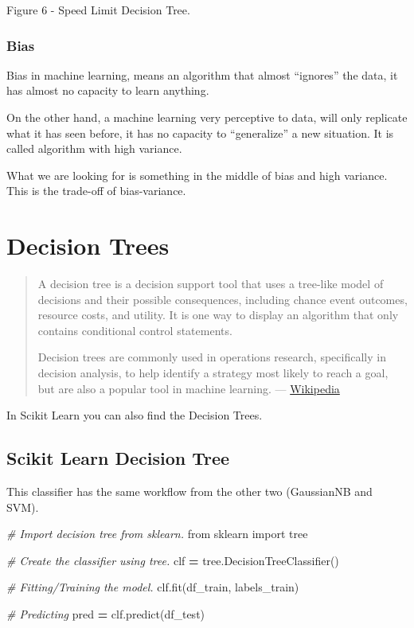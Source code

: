 \documentclass[]{book}
\newenvironment{Shaded}{\begin{snugshade}}{\end{snugshade}}
\newcommand{\ImportTok}[1]{#1}
\newcommand{\CommentTok}[1]{\textcolor[rgb]{0.56,0.35,0.01}{\textit{#1}}}
\newcommand{\OperatorTok}[1]{\textcolor[rgb]{0.81,0.36,0.00}{\textbf{#1}}}
\newcommand{\NormalTok}[1]{#1}
\begin{document}
Figure 6 - Speed Limit Decision Tree.

\subsubsection{Bias}\label{bias}

Bias in machine learning, means an algorithm that almost ``ignores'' the
data, it has almost no capacity to learn anything.

On the other hand, a machine learning very perceptive to data, will only
replicate what it has seen before, it has no capacity to ``generalize''
a new situation. It is called algorithm with high variance.

What we are looking for is something in the middle of bias and high
variance. This is the trade-off of bias-variance.

\section{Decision Trees}\label{decision-trees-1}

\begin{quote}
A decision tree is a decision support tool that uses a tree-like model
of decisions and their possible consequences, including chance event
outcomes, resource costs, and utility. It is one way to display an
algorithm that only contains conditional control statements.

Decision trees are commonly used in operations research, specifically in
decision analysis, to help identify a strategy most likely to reach a
goal, but are also a popular tool in machine learning. ---
\href{https://en.wikipedia.org/wiki/Decision_tree}{Wikipedia}
\end{quote}

In Scikit Learn you can also find the Decision Trees.

\subsection{Scikit Learn Decision
Tree}\label{scikit-learn-decision-tree-1}

This classifier has the same workflow from the other two (GaussianNB and
SVM).

\begin{Shaded}
\begin{Highlighting}[]
\CommentTok{# Import decision tree from sklearn.}
\ImportTok{from}\NormalTok{ sklearn }\ImportTok{import}\NormalTok{ tree}

\CommentTok{# Create the classifier using tree.}
\NormalTok{clf }\OperatorTok{=}\NormalTok{ tree.DecisionTreeClassifier()}

\CommentTok{# Fitting/Training the model.}
\NormalTok{clf.fit(df_train, labels_train)}

\CommentTok{# Predicting}
\NormalTok{pred }\OperatorTok{=}\NormalTok{ clf.predict(df_test)}
\end{Highlighting}
\end{Shaded}
\end{document}
